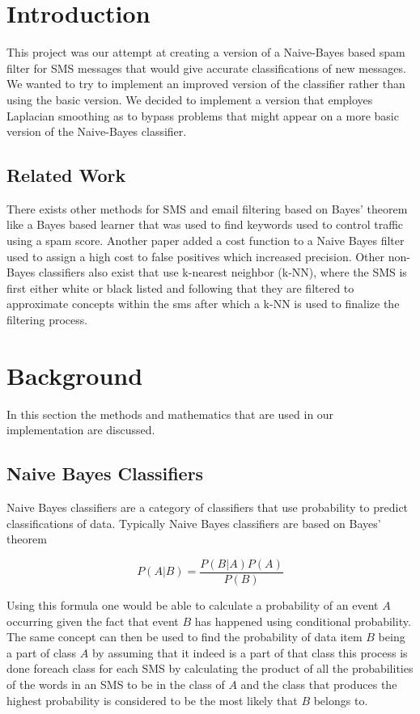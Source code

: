 \section{Introduction}
This project was our attempt at creating a version of a Naive-Bayes based spam filter for SMS messages that would give accurate classifications of new messages. We wanted to try to implement an improved version of the classifier rather than using the basic version. We decided to implement a version that employes Laplacian smoothing as to bypass problems that might appear on a more basic version of the Naive-Bayes classifier.





\subsection{Related Work}
There exists other methods for SMS and email filtering based on Bayes' theorem like  a Bayes based learner that was used to find keywords used to control traffic using a spam score. Another paper added a cost function to a Naive Bayes filter used to assign a high cost to false positives which increased precision. Other non-Bayes classifiers also exist that use k-nearest neighbor (k-NN), where the SMS is first either white or black listed and following that they are filtered to approximate concepts within the sms after which a k-NN is used to finalize the filtering process.\cite{delany_buckley_greene_2012}
\section{Background}
In this section the methods and mathematics that are used in our implementation are discussed.
\subsection{Naive Bayes Classifiers}
Naive Bayes classifiers are a category of classifiers that use probability to predict classifications of data. Typically Naive Bayes classifiers are based on Bayes' theorem



\[P(A|B) = \frac{P(B|A)P(A)}{P(B)}\]
 
Using this formula one would be able to calculate a probability of an event \(A\) occurring given the fact that event \(B\) has happened using conditional probability.
The same concept can then be used to find the probability of data item \(B\) being a part of class \(A\) by assuming that it indeed is a part of that class this process is done foreach class for each SMS by calculating the product of all the probabilities of the words in an SMS to be in the class of \(A\)  and the class that produces the highest probability is considered to be the most likely that \(B\) belongs to.


